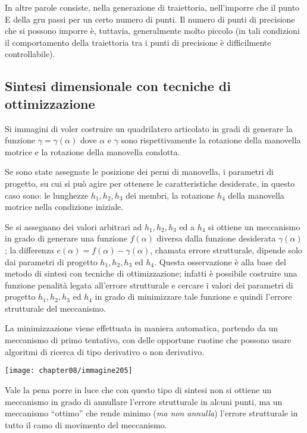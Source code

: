 In altre parole consiste, nella generazione di traiettoria, nell'imporre che il punto E della gru passi per un certo numero di punti. Il numero di punti di precisione che si possono imporre è, tuttavia, generalmente molto piccolo (in tali condizioni il comportamento della traiettoria tra i punti di precisione è difficilmente controllabile).

\subsection{Sintesi dimensionale con tecniche di ottimizzazione}

Si immagini di voler costruire un quadrilatero articolato in gradi di generare la funzione $\gamma = \gamma(\alpha)$ dove $\alpha$ e $\gamma$ sono rispettivamente la rotazione della manovella motrice e la rotazione della manovella condotta.

Se sono state assegnate le posizione dei perni di manovella, i parametri di progetto, su cui si può agire per ottenere le caratteristiche desiderate, in questo caso sono: le lunghezze $h_1, h_2, h_3$ dei membri, la rotazione $h_4$ della manovella motrice nella condizione iniziale.

Se si assegnano dei valori arbitrari ad $h_1, h_2, h_3$ ed a $h_4$ si ottiene un meccanismo in grado di generare una funzione $f(\alpha)$ diversa dalla funzione desiderata $\gamma(\alpha)$; la  differenza $e(\alpha) = f(\alpha) - \gamma(\alpha)$, chamata errore strutturale, dipende solo dai parametri di progetto $h_1, h_2, h_3$ ed $h_4$. Questa osservazione è alla base del metodo di sintesi con tecniche di ottimizzazione; infatti è possibile costruire una funzione penalità legata all'errore strutturale e cercare i valori dei parametri di progetto $h_1, h_2, h_3$ ed $h_4$ in grado di minimizzare tale funzione e quindi  l'errore strutturale del meccanismo.

La minimizzazione viene effettuata in maniera automatica, partendo da un meccanismo di primo tentativo, con delle opportune ruotine che possono usare algoritmi di ricerca di tipo derivativo o non derivativo.
\begin{center}
\texttt{[image: chapter08/immagine205]}
\end{center}

Vale la pena porre in luce che con questo tipo di sintesi non si ottiene un meccanismo in grado di annullare l'errore strutturale in alcuni punti, ma un meccanismo ``ottimo'' che rende minimo (\emph{ma non annulla}) l'errore strutturale in tutto il camo di movimento del meccanismo.


